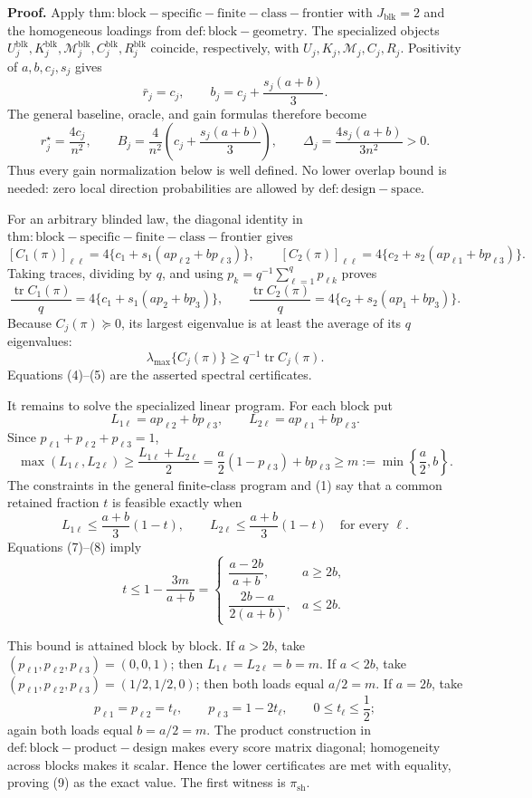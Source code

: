 \textbf{Proof.}
Apply \(\mathrm{thm:block-specific-finite-class-frontier}\) with \(J_{\mathrm{blk}}=2\) and the homogeneous loadings from \(\mathrm{def:block-geometry}\).  The specialized objects \(U_j^{\mathrm{blk}},K_j^{\mathrm{blk}},\mathcal M_j^{\mathrm{blk}},C_j^{\mathrm{blk}},R_j^{\mathrm{blk}}\) coincide, respectively, with \(U_j,K_j,\mathcal M_j,C_j,R_j\).  Positivity of \(a,b,c_j,s_j\) gives
\[
\bar r_j=c_j,
\qquad
b_j=c_j+\frac{s_j(a+b)}3.
\tag{1}
\]
The general baseline, oracle, and gain formulas therefore become
\[
r_j^\star=\frac{4c_j}{n^2},
\qquad
B_j=\frac4{n^2}\left(c_j+\frac{s_j(a+b)}3\right),
\qquad
\Delta_j=\frac{4s_j(a+b)}{3n^2}>0.
\tag{2}
\]
Thus every gain normalization below is well defined.  No lower overlap bound is needed: zero local direction probabilities are allowed by \(\mathrm{def:design-space}\).

For an arbitrary blinded law, the diagonal identity in \(\mathrm{thm:block-specific-finite-class-frontier}\) gives
\[
[C_1(\pi)]_{\ell\ell}
=4\{c_1+s_1(ap_{\ell2}+bp_{\ell3})\},
\qquad
[C_2(\pi)]_{\ell\ell}
=4\{c_2+s_2(ap_{\ell1}+bp_{\ell3})\}.
\tag{3}
\]
Taking traces, dividing by \(q\), and using \(p_k=q^{-1}\sum_{\ell=1}^q p_{\ell k}\) proves
\[
\frac{\operatorname{tr}C_1(\pi)}q
=4\{c_1+s_1(ap_2+bp_3)\},
\qquad
\frac{\operatorname{tr}C_2(\pi)}q
=4\{c_2+s_2(ap_1+bp_3)\}.
\tag{4}
\]
Because \(C_j(\pi)\succeq0\), its largest eigenvalue is at least the average of its \(q\) eigenvalues:
\[
\lambda_{\max}\{C_j(\pi)\}\ge q^{-1}\operatorname{tr}C_j(\pi).
\tag{5}
\]
Equations (4)--(5) are the asserted spectral certificates.

It remains to solve the specialized linear program.  For each block put
\[
L_{1\ell}=ap_{\ell2}+bp_{\ell3},
\qquad
L_{2\ell}=ap_{\ell1}+bp_{\ell3}.
\tag{6}
\]
Since \(p_{\ell1}+p_{\ell2}+p_{\ell3}=1\),
\[
\max(L_{1\ell},L_{2\ell})
\ge \frac{L_{1\ell}+L_{2\ell}}2
=\frac a2(1-p_{\ell3})+bp_{\ell3}
\ge m:=\min\left\{\frac a2,b\right\}.
\tag{7}
\]
The constraints in the general finite-class program and (1) say that a common retained fraction \(t\) is feasible exactly when
\[
L_{1\ell}\le\frac{a+b}{3}(1-t),
\qquad
L_{2\ell}\le\frac{a+b}{3}(1-t)
\quad\text{for every }\ell.
\tag{8}
\]
Equations (7)--(8) imply
\[
t\le1-\frac{3m}{a+b}
=
\begin{cases}
\dfrac{a-2b}{a+b},&a\ge2b,\\[6pt]
\dfrac{2b-a}{2(a+b)},&a\le2b.
\end{cases}
\tag{9}
\]

This bound is attained block by block.  If \(a>2b\), take \((p_{\ell1},p_{\ell2},p_{\ell3})=(0,0,1)\); then \(L_{1\ell}=L_{2\ell}=b=m\).  If \(a<2b\), take \((p_{\ell1},p_{\ell2},p_{\ell3})=(1/2,1/2,0)\); then both loads equal \(a/2=m\).  If \(a=2b\), take
\[
p_{\ell1}=p_{\ell2}=t_\ell,
\qquad
p_{\ell3}=1-2t_\ell,
\qquad
0\le t_\ell\le\frac12;
\tag{10}
\]
again both loads equal \(b=a/2=m\).  The product construction in \(\mathrm{def:block-product-design}\) makes every score matrix diagonal; homogeneity across blocks makes it scalar.  Hence the lower certificates are met with equality, proving (9) as the exact value.  The first witness is \(\pi_{\mathrm{sh}}\).

